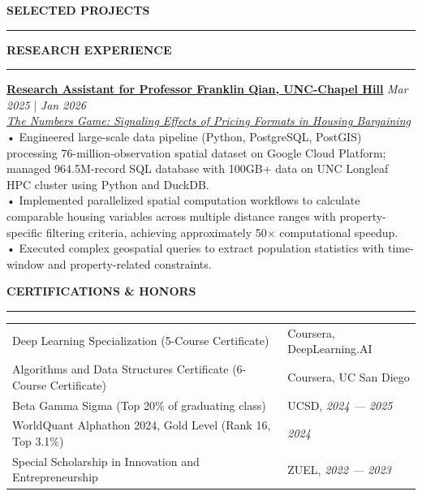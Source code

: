 \documentclass{resume} %
\renewcommand{\sectionskip}{\vspace{0.10cm}}        %
\renewcommand{\sectionlineskip}{\vspace{0.10cm}}
\renewenvironment{rSection}[1]{
\sectionskip
\textcolor{UC San Diego Blue}{\textbf{\large\bfseries\MakeUppercase{#1}}}

\sectionlineskip
\hrule
\begin{list}{}{
\setlength{\leftmargin}{0em}
}
\item[]
}{
\end{list}
}
\begin{document}
\begin{rSection}{SELECTED PROJECTS}

\begin{rSection}{RESEARCH EXPERIENCE}
\noindent
\textbf{\href{https://github.com/YuankaiTao-super/Construction-of-Comparable-Housing-Variables}{Research Assistant for Professor Franklin Qian, UNC-Chapel Hill}} \hfill {\em Mar 2025} | {\em Jan 2026}\\
\textit{\href{https://papers.ssrn.com/sol3/papers.cfm?abstract_id=4406954}{The Numbers Game: Signaling Effects of Pricing Formats in Housing Bargaining}}\\[4pt]
• Engineered large-scale data pipeline (Python, PostgreSQL, PostGIS) processing 76-million-observation spatial dataset on Google Cloud Platform; managed 964.5M-record SQL database with 100GB+ data on UNC Longleaf HPC cluster using Python and DuckDB.\\[1.5pt]
• Implemented parallelized spatial computation workflows to calculate comparable housing variables across multiple distance ranges with property-specific filtering criteria, achieving approximately 50$\times$ computational speedup.\\[1.5pt]
• Executed complex geospatial queries to extract population statistics with time-window and property-related constraints.

\end{rSection}

\end{rSection}

\begin{rSection}{Certifications \& Honors}
\begin{tabularx}{\textwidth}{@{} >{\raggedright\arraybackslash}X >{\raggedleft\arraybackslash\hyphenpenalty=10000\exhyphenpenalty=10000}p{4.8cm} @{}}
Deep Learning Specialization (5-Course Certificate) & Coursera, DeepLearning.AI \\
Algorithms and Data Structures Certificate (6-Course Certificate) & Coursera, UC San Diego \\
Beta Gamma Sigma (Top 20\% of graduating class) & UCSD, {\em 2024 --- 2025} \\
WorldQuant Alphathon 2024, Gold Level (Rank 16, Top 3.1\%) & {\em 2024} \\
Special Scholarship in Innovation and Entrepreneurship & ZUEL, {\em 2022 --- 2023}
\end{tabularx}
\end{rSection}
\end{document}
